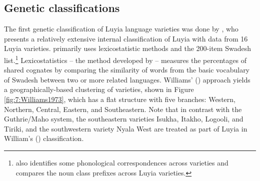 \documentclass[output=paper]{langscibook}
\begin{document}
\subsection{Genetic classifications \citep{mould_comparative_1976,mould_greater_1981,williams_lexico-statistical_1973,nurse_bantu_1980}}
\label{sec:2.2:Genetic_classifications}

The first genetic classification of Luyia language varieties was done by \citet{williams_lexico-statistical_1973}, who presents a relatively extensive internal classification of Luyia with data from 16 Luyia varieties. \citet{williams_lexico-statistical_1973} primarily uses lexicostatistic methods and the 200-item Swadesh list.\footnote{\citet{williams_lexico-statistical_1973} also identifies some phonological correspondences across varieties and compares the noun class prefixes across Luyia varieties.} Lexicostatistics -- the method developed by \citet{swadesh-1952-lexicostatistic-dating} -- measures the percentages of shared cognates by comparing the similarity of words from the basic vocabulary of Swadesh between two or more related languages. Williams' (\citeyear{williams_lexico-statistical_1973}) approach yields a geographically-based clustering of varieties, shown in Figure \ref{fig:7:Williams1973}, which has a flat structure with five branches: Western, Northern, Central, Eastern, and Southeastern. Note that in contrast with the Guthrie/Maho system, the southeastern varieties Isukha, Itakho, Logooli, and Tiriki, and the southwestern variety Nyala West are treated as part of Luyia in William's (\citeyear{williams_lexico-statistical_1973}) classification. 
\end{document}
